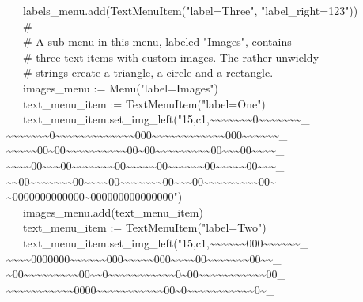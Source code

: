 {\>   \ \ \ labels\_menu.add(TextMenuItem("label=Three", "label\_right=123")) \\
\>   \ \ \ \# \\
\>   \ \ \ \# A sub-menu in this menu, labeled "Images", contains \\
\>   \ \ \ \# three text items with custom images. The rather unwieldy \\
\>   \ \ \ \# strings create a triangle, a circle and a rectangle. \\
\>   \ \ \ images\_menu := Menu("label=Images") \\
\>   \ \ \ text\_menu\_item := TextMenuItem("label=One") \\
\>   \ \ \ text\_menu\_item.set\_img\_left("15,c1,\~{}\~{}\~{}\~{}\~{}\~{}\~{}0\~{}\~{}\~{}\~{}\~{}\~{}\~{}\_ \\
\>\>\~{}\~{}\~{}\~{}\~{}\~{}\~{}0\~{}\~{}\~{}\~{}\~{}\~{}\~{}\~{}\~{}\~{}\~{}\~{}\~{}000\~{}\~{}\~{}\~{}\~{}\~{}\~{}\~{}\~{}\~{}\~{}\~{}000\~{}\~{}\~{}\~{}\~{}\~{}\_ \\
\>\>\~{}\~{}\~{}\~{}\~{}00\~{}00\~{}\~{}\~{}\~{}\~{}\~{}\~{}\~{}\~{}\~{}00\~{}00\~{}\~{}\~{}\~{}\~{}\~{}\~{}\~{}\~{}00\~{}\~{}\~{}00\~{}\~{}\~{}\~{}\_ \\
\>\>\~{}\~{}\~{}\~{}00\~{}\~{}\~{}00\~{}\~{}\~{}\~{}\~{}\~{}\~{}00\~{}\~{}\~{}\~{}\~{}00\~{}\~{}\~{}\~{}\~{}\~{}00\~{}\~{}\~{}\~{}\~{}00\~{}\~{}\~{}\_ \\
\>\>\~{}\~{}00\~{}\~{}\~{}\~{}\~{}\~{}\~{}00\~{}\~{}\~{}\~{}00\~{}\~{}\~{}\~{}\~{}\~{}\~{}00\~{}\~{}\~{}00\~{}\~{}\~{}\~{}\~{}\~{}\~{}\~{}\~{}00\~{}\_ \\
\>\>\~{}0000000000000\~{}000000000000000") \\
\>   \ \ \ images\_menu.add(text\_menu\_item) \\
\>   \ \ \ text\_menu\_item :=
TextMenuItem("label=Two") \\
\>   \ \ \ text\_menu\_item.set\_img\_left("15,c1,\~{}\~{}\~{}\~{}\~{}\~{}000\~{}\~{}\~{}\~{}\~{}\~{}\_ \\
\>\>\~{}\~{}\~{}\~{}0000000\~{}\~{}\~{}\~{}\~{}\~{}000\~{}\~{}\~{}\~{}\~{}000\~{}\~{}\~{}\~{}00\~{}\~{}\~{}\~{}\~{}\~{}\~{}00\~{}\~{}\_ \\
\>\>\~{}00\~{}\~{}\~{}\~{}\~{}\~{}\~{}\~{}\~{}00\~{}\~{}0\~{}\~{}\~{}\~{}\~{}\~{}\~{}\~{}\~{}\~{}\~{}0\~{}00\~{}\~{}\~{}\~{}\~{}\~{}\~{}\~{}\~{}\~{}\~{}00\_ \\
\>\~{}\~{}\~{}\~{}\~{}\~{}\~{}\~{}\~{}\~{}\~{}0000\~{}\~{}\~{}\~{}\~{}\~{}\~{}\~{}\~{}\~{}\~{}00\~{}0\~{}\~{}\~{}\~{}\~{}\~{}\~{}\~{}\~{}\~{}\~{}0\~{}\_ \\
}
